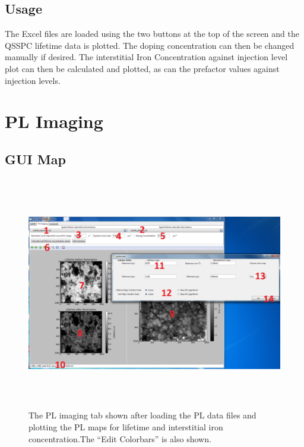 \documentclass[final,a4paper,oneside,12pt]{article}
\begin{document}
\subsection{Usage}
The Excel files are loaded using the two buttons at the top of the screen and the QSSPC lifetime data is plotted. The doping concentration can then be changed manually if desired. The interstitial Iron Concentration against injection level plot can then be calculated and plotted, as can the prefactor values against injection levels.

\section{PL Imaging}
\subsection{GUI Map}

\begin{figure}[h]
\includegraphics[height=4in]{pllabel}
\caption{\label{figure2} The PL imaging tab shown after loading the PL data files and plotting the PL maps for lifetime and interstitial iron concentration.The ``Edit Colorbars'' is also shown.}
\end{figure}
\end{document}

